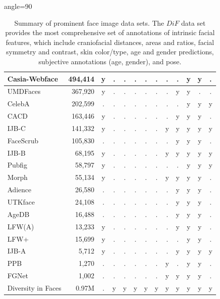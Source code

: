 \documentclass[letterpaper,11pt]{article}
\begin{document}
\begin{table}[!htbp]
\begin{center}
\begin{adjustbox}{angle=90}
\begin{small}
\begin{tabular}{|l|r|c|c|c|c|c|c|c|c|c|c|c|}
Casia-Webface \cite{CASIA_ARXIV14}&	494,414& y & . & . & . & . & . & . & . & y & y & . \\ \hline
UMDFaces \cite{UMDFaces_ARXIV16} & 367,920 & y & . & . & . & . & . & . & y & y & . & . \\ \hline
CelebA \cite{CelebA_ICCV15}  & 202,599	   & . & . & . & . & . & . & . & . & y & y & y \\ \hline
CACD \cite{CACD_TMM15} &	163,446        & y & . & . & . & . & . & . & y & y & y & . \\ \hline
IJB-C \cite{IJB-C_ICB18} &	141,332	       & y & . & . & . & . & . & y & y & y & y & y \\ \hline
FaceScrub \cite{FaceScrub_ICIP14} & 105,830& . & . & . & . & . & . & . & y & y & y & . \\ \hline
IJB-B \cite{IJB-B_CVPRW17} & 68,195        & y & . & . & . & . & . & y & y & y & y & y \\ \hline
Pubfig \cite{Pubfig_PAMI11} & 58,797       & y & . & . & . & . & . & . & . & y & y & y \\ \hline
Morph \cite{morph_FG06}&	55,134         & y & . & . & . & . & . & y & y & y & y & . \\ \hline
Adience \cite{Adience_TIFS14} &26,580      & . & . & . & . & . & . & . & y & y & y & . \\ \hline
UTKface \cite{UTKface_CVPR17} & 24,108     & . & . & . & . & . & . & . & y & y & y & . \\ \hline
AgeDB \cite{AgeDB_CVPRW17}  & 16,488       & . & . & . & . & . & . & . & y & y & y & . \\ \hline
LFW(A) \cite{LFW_Tech07}	& 13,233       & y & . & . & . & . & . & . & y & y & y & . \\ \hline
LFW+ \cite{lfwplus_TPAMI17}	& 	15,699     & y & . & . & . & . & . & . & . & y & y & . \\ \hline
IJB-A \cite{IJB-A_CVPR15} & 5,712          & y & . & . & . & . & . & . & y & y & y & y \\ \hline
PPB \cite{gendershades_FAT18} &1,270       & . & . & . & . & . & . & y & . & y & y & . \\ \hline
FGNet \cite{FGNET_IET_BIOMETRICS16} &1,002 & . & . & . & . & . & . & y & y & y & y & . \\ \hline
\hline
{Diversity in Faces} & {0.97M} & {.} & {y}& {y}& {y} & {y} & {y} & {y} & {y} & {y} & {y} &{y}\\ \hline
\end{tabular}
\end{small}
\end{adjustbox}
\end{center}
\vspace{-0.5cm}
\caption{Summary of prominent face image data sets. The $DiF$ data set provides the most comprehensive set of annotations of intrinsic facial features, which include craniofacial distances, areas and ratios, facial symmetry and contrast, skin color/type, age and gender predictions, subjective annotations (age, gender), and pose.}
\label{tab:face_db}
\end{table}
\end{document}

